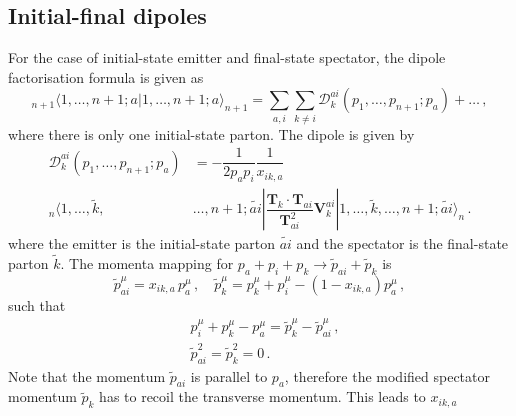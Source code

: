 \documentclass[main.tex]{subfiles}
\begin{document}
    \subsection{Initial-final dipoles}
        For the case of initial-state emitter and final-state spectator,
        the dipole factorisation formula is given as
        \begin{equation}\label{eqn:IF_factorisation}
            {}_{n+1} \langle 1, \ldots, n+1; a | 1, \ldots, n+1; a \rangle_{n+1} = \sum_{a,i}\sum_{k \neq i}\mathcal{D}_{k}^{ai}(p_{1},\ldots,p_{n+1};p_{a}) + \ldots \, ,
        \end{equation}
        where there is only one initial-state parton. The dipole is given by
        \begin{equation}\label{eqn:D_aik}
            \begin{split}
            \mathcal{D}_{k}^{ai}(p_{1}, \ldots, p_{n+1};p_{a}) &= -\dfrac{1}{2p_{a}p_{i}}\dfrac{1}{x_{ik,a}} \\
            {}_{n}\langle 1, \ldots, \tilde{k}, &\ldots, n+1 ; \widetilde{ai} | \dfrac{\boldsymbol{T}_{k} \cdot \boldsymbol{T}_{ai}}{\boldsymbol{T}_{ai}^{2}} \boldsymbol{V}_{k}^{ai} | 1, \ldots, \tilde{k}, \ldots, n+1; \widetilde{ai} \rangle_{n} \, .
            \end{split}
        \end{equation}
        where the emitter is the initial-state parton $\widetilde{ai}$
        and the spectator is the final-state parton $\tilde{k}$.
        The momenta mapping for $p_{a} + p_{i} + p_{k} \rightarrow \tilde{p}_{ai} + \tilde{p}_{k}$ is
        \begin{equation}\label{eqn:IF_mapping}
            \tilde{p}_{ai}^{\mu} = x_{ik,a} \, p_{a}^{\mu} \, , \quad \tilde{p}_{k}^{\mu} = p_{k}^{\mu} + p_{i}^{\mu} - (1-x_{ik,a})p_{a}^{\mu} \, ,
        \end{equation}
        such that
        \begin{equation}\label{eqn:IF_mapping_conditions}
            \begin{split}
            &p_{i}^{\mu} + p_{k}^{\mu} - p_{a}^{\mu} = \tilde{p}_{k}^{\mu} - \tilde{p}_{ai}^{\mu} \, , \\
            &\tilde{p}_{ai}^{2} = \tilde{p}_{k}^{2} = 0 \, .
            \end{split}
        \end{equation}
        Note that the momentum $\tilde{p}_{ai}$ is parallel
        to $p_{a}$, therefore the modified spectator momentum $\tilde{p}_{k}$
        has to recoil the transverse momentum. This leads to $x_{ik,a}$
\end{document}
